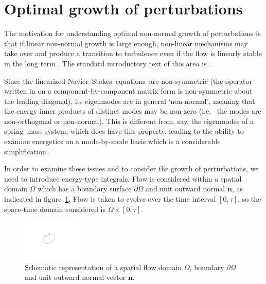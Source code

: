 \documentclass[11pt,a4paper]{report}
\newcommand\NavSto{Navier--Stokes}
\newcommand\LNS{linearized \NavSto}
\newcommand\LNSE{\LNS\ equations}
\newcommand{\ie}{i.e.\ }
\begin{document}
\section{Optimal growth of perturbations}

The motivation for understanding optimal non-normal growth of
perturbations is that if linear non-normal growth is large enough,
non-linear mechanisms may take over and produce a transition to
turbulence even if the flow is linearly stable in the long term
\citep[see e.g.][]{srk02}.
%
The standard introductory text of this area is \citet{schmid01}.

Since the \LNSE\ are non-symmetric (the operator written in on a
comp\-on\-ent-by-component matrix form is non-symmetric about the
leading diagonal), its eigenmodes are in general `non-normal', meaning
that the energy inner products of distinct modes may be non-zero (\ie
the modes are non-orthogonal or non-normal).  This is different from,
say, the eigenmodes of a spring--mass system, which does have this
property, leading to the ability to examine energetics on a
mode-by-mode basis which is a considerable simplification.  

In order to examine these issues and to consider the growth of
perturbations, we need to introduce energy-type integrals.
%
Flow is considered within a spatial domain $\Omega$ which has a
boundary surface $\partial\Omega$ and unit outward normal $\bm{n}$, as
indicated in figure~\ref{fig.domain}.  Flow is taken to evolve over
the time interval $[0,\tau]$, so the space-time domain considered is
$\Omega\times[0,\tau]$.

\begin{figure}
\begin{center}
\includegraphics[width=0.25\textwidth]{generaldomain}
\end{center}
\caption{Schematic representation of a spatial flow domain $\Omega$,
  boundary $\partial\Omega$ and unit outward normal vector $\bm{n}$.}
\label{fig.domain}
\end{figure}
\end{document}

